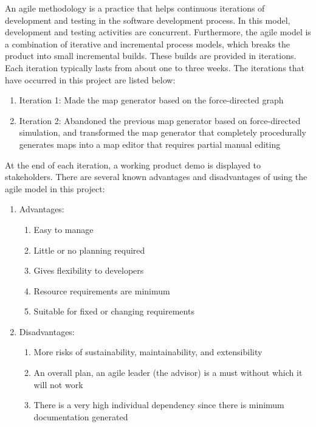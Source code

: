 An agile methodology is a practice that helps continuous iterations of development and testing in the software development process. In this model, development and testing activities are concurrent. Furthermore, the agile model is a combination of iterative and incremental process models, which breaks the product into small incremental builds. These builds are provided in iterations. Each iteration typically lasts from about one to three weeks.
The iterations that have occurred in this project are listed below:
\begin{enumerate}
  \item Iteration 1: Made the map generator based on the force-directed graph
  \item Iteration 2: Abandoned the previous map generator based on force-directed simulation, and transformed the map generator that completely procedurally generates maps into a map editor that requires partial manual editing
\end{enumerate}
At the end of each iteration, a working product demo is displayed to stakeholders. There are several known advantages and disadvantages of using the agile model in this project:
\begin{enumerate}

  \item Advantages:
  \begin{enumerate}
    \item Easy to manage
    \item Little or no planning required
    \item Gives flexibility to developers
    \item Resource requirements are minimum
    \item Suitable for fixed or changing requirements
  \end{enumerate}

  \item Disadvantages:
  \begin{enumerate}
    \item More risks of sustainability, maintainability, and extensibility
    \item An overall plan, an agile leader (the advisor) is a must without which it will not work
    \item There is a very high individual dependency since there is minimum documentation generated
  \end{enumerate}

\end{enumerate}
